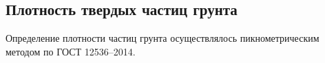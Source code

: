 %
%
%
%
%



\subsection{Плотность твердых частиц грунта}

Определение плотности частиц грунта осуществлялось пикнометрическим методом по 
ГОСТ 12536--2014. 
%
%
%
%
%

